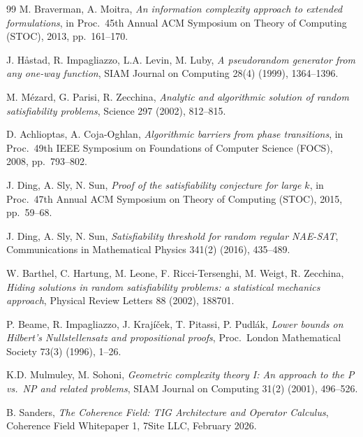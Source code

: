 \documentclass[11pt]{article}
\theoremstyle{definition}
\theoremstyle{remark}
\begin{document}
\begin{thebibliography}{99}
  M. Braverman, A. Moitra,
  \textit{An information complexity approach to extended formulations},
  in Proc.\ 45th Annual ACM Symposium on Theory of Computing (STOC), 2013, pp.\ 161--170.

  J. H\aa stad, R. Impagliazzo, L.A. Levin, M. Luby,
  \textit{A pseudorandom generator from any one-way function},
  SIAM Journal on Computing 28(4) (1999), 1364--1396.

  M. M\'ezard, G. Parisi, R. Zecchina,
  \textit{Analytic and algorithmic solution of random satisfiability problems},
  Science 297 (2002), 812--815.

  D. Achlioptas, A. Coja-Oghlan,
  \textit{Algorithmic barriers from phase transitions},
  in Proc.\ 49th IEEE Symposium on Foundations of Computer Science (FOCS), 2008, pp.\ 793--802.

  J. Ding, A. Sly, N. Sun,
  \textit{Proof of the satisfiability conjecture for large $k$},
  in Proc.\ 47th Annual ACM Symposium on Theory of Computing (STOC), 2015, pp.\ 59--68.

  J. Ding, A. Sly, N. Sun,
  \textit{Satisfiability threshold for random regular NAE-SAT},
  Communications in Mathematical Physics 341(2) (2016), 435--489.

  W. Barthel, C. Hartung, M. Leone, F. Ricci-Tersenghi, M. Weigt, R. Zecchina,
  \textit{Hiding solutions in random satisfiability problems: a statistical mechanics approach},
  Physical Review Letters 88 (2002), 188701.

  P. Beame, R. Impagliazzo, J. Kraj\'i\v{c}ek, T. Pitassi, P. Pudl\'ak,
  \textit{Lower bounds on Hilbert's Nullstellensatz and propositional proofs},
  Proc.\ London Mathematical Society 73(3) (1996), 1--26.

  K.D. Mulmuley, M. Sohoni,
  \textit{Geometric complexity theory I: An approach to the P vs.\ NP and related problems},
  SIAM Journal on Computing 31(2) (2001), 496--526.

  B. Sanders,
  \textit{The Coherence Field: TIG Architecture and Operator Calculus},
  Coherence Field Whitepaper 1, 7Site LLC, February 2026.

\end{thebibliography}
\end{document}
